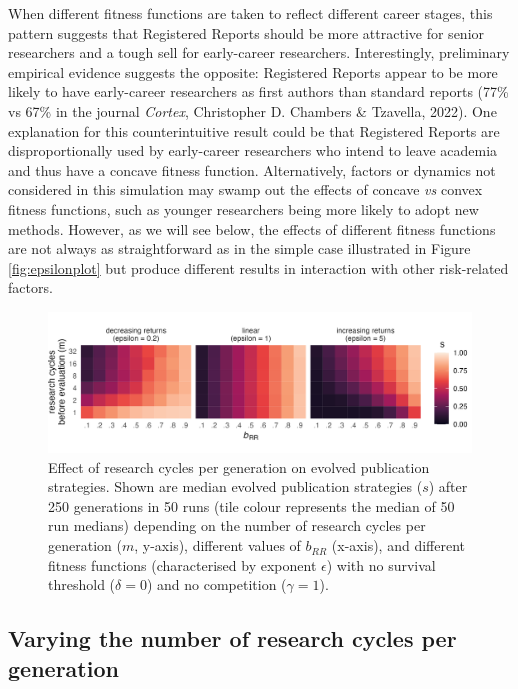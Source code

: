 \documentclass[
  ,man,mask,floatsintext]{apa6}
\begin{document}
When different fitness functions are taken to reflect different career stages,
this pattern suggests that Registered Reports should be more attractive for senior researchers and a tough sell for early-career researchers.
Interestingly, preliminary empirical evidence suggests the opposite:
Registered Reports appear to be more likely to have early-career researchers as first authors than standard reports (77\% vs 67\% in the journal \emph{Cortex}, Christopher D. Chambers \& Tzavella, 2022).
One explanation for this counterintuitive result could be that Registered Reports are disproportionally used by early-career researchers who intend to leave academia and thus have a concave fitness function.
Alternatively, factors or dynamics not considered in this simulation may swamp out the effects of concave \emph{vs} convex fitness functions, such as younger researchers being more likely to adopt new methods.
However, as we will see below, the effects of different fitness functions are not always as straightforward as in the simple case illustrated in Figure \ref{fig:epsilonplot} but produce different results in interaction with other risk-related factors.



\begin{figure}

{\centering \includegraphics[width=1\linewidth]{plots/plot_m_evo_rocket} 

}

\caption{Effect of research cycles per generation on evolved publication strategies. Shown are median evolved publication strategies (\(s\)) after 250 generations in 50 runs (tile colour represents the median of 50 run medians) depending on the number of research cycles per generation (\(m\), y-axis), different values of \(b_{RR}\) (x-axis), and different fitness functions (characterised by exponent \(\epsilon\)) with no survival threshold (\(\delta = 0\)) and no competition (\(\gamma = 1\)).}\label{fig:mplot}
\end{figure}

\hypertarget{varying-the-number-of-research-cycles-per-generation}{%
\subsection{Varying the number of research cycles per generation}\label{varying-the-number-of-research-cycles-per-generation}}
\end{document}
